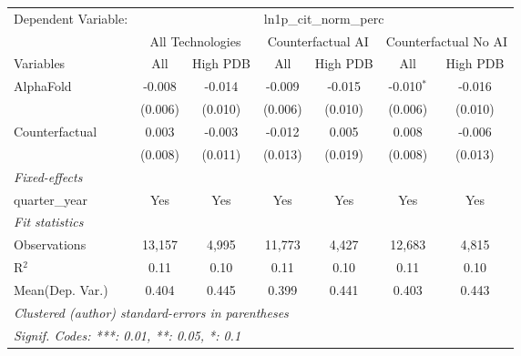 \begingroup
\centering
\begin{tabular}{lcccccc}
   \tabularnewline \midrule \midrule
   Dependent Variable: & \multicolumn{6}{c}{ln1p\_cit\_norm\_perc}\\
 & \multicolumn{2}{c}{All Technologies} & \multicolumn{2}{c}{Counterfactual AI} & \multicolumn{2}{c}{Counterfactual No AI} \\
\cmidrule(lr){1-1}\cmidrule(lr){2-3} \cmidrule(lr){4-5} \cmidrule(lr){6-7}
Variables & \multicolumn{1}{c}{All} & \multicolumn{1}{c}{High PDB} & \multicolumn{1}{c}{All} & \multicolumn{1}{c}{High PDB} & \multicolumn{1}{c}{All} & \multicolumn{1}{c}{High PDB} \\
\cmidrule(lr){1-1}\cmidrule(lr){2-2} \cmidrule(lr){3-3} \cmidrule(lr){4-4} \cmidrule(lr){5-5} \cmidrule(lr){6-6} \cmidrule(lr){7-7}
   AlphaFold      & -0.008  & -0.014  & -0.009  & -0.015  & -0.010$^{*}$ & -0.016\\   
                  & (0.006) & (0.010) & (0.006) & (0.010) & (0.006)      & (0.010)\\   
   Counterfactual & 0.003   & -0.003  & -0.012  & 0.005   & 0.008        & -0.006\\   
                  & (0.008) & (0.011) & (0.013) & (0.019) & (0.008)      & (0.013)\\   
   \midrule
   \emph{Fixed-effects}\\
   quarter\_year  & Yes     & Yes     & Yes     & Yes     & Yes          & Yes\\  
   \midrule
   \emph{Fit statistics}\\
   Observations   & 13,157  & 4,995   & 11,773  & 4,427   & 12,683       & 4,815\\  
   R$^2$          & 0.11    & 0.10    & 0.11    & 0.10    & 0.11         & 0.10\\  
Mean(Dep. Var.) & 0.404 & 0.445 & 0.399 & 0.441 & 0.403 & 0.443 \\
   \midrule \midrule
   \multicolumn{7}{l}{\emph{Clustered (author) standard-errors in parentheses}}\\
   \multicolumn{7}{l}{\emph{Signif. Codes: ***: 0.01, **: 0.05, *: 0.1}}\\
\end{tabular}
\par\endgroup

